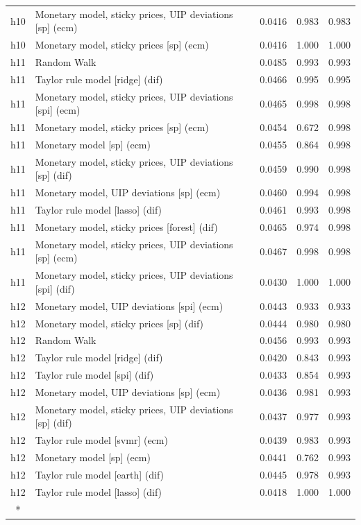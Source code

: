 \begin{ThreePartTable}
\begin{longtable}[t]{cp{5.5cm}ccc}
h10 & \raggedright Monetary model, sticky prices, UIP deviations [sp] (ecm) & 0.0416 & 0.983 & 0.983\\
h10 & \raggedright Monetary model, sticky prices [sp] (ecm) & 0.0416 & 1.000 & 1.000\\
\addlinespace
h11 & \raggedright Random Walk & 0.0485 & 0.993 & 0.993\\
h11 & \raggedright Taylor rule model [ridge] (dif) & 0.0466 & 0.995 & 0.995\\
h11 & \raggedright Monetary model, sticky prices, UIP deviations [spi] (ecm) & 0.0465 & 0.998 & 0.998\\
h11 & \raggedright Monetary model, sticky prices [sp] (ecm) & 0.0454 & 0.672 & 0.998\\
h11 & \raggedright Monetary model [sp] (ecm) & 0.0455 & 0.864 & 0.998\\
h11 & \raggedright Monetary model, sticky prices, UIP deviations [sp] (dif) & 0.0459 & 0.990 & 0.998\\
h11 & \raggedright Monetary model, UIP deviations [sp] (ecm) & 0.0460 & 0.994 & 0.998\\
h11 & \raggedright Taylor rule model [lasso] (dif) & 0.0461 & 0.993 & 0.998\\
h11 & \raggedright Monetary model, sticky prices [forest] (dif) & 0.0465 & 0.974 & 0.998\\
h11 & \raggedright Monetary model, sticky prices, UIP deviations [sp] (ecm) & 0.0467 & 0.998 & 0.998\\
h11 & \raggedright Monetary model, sticky prices, UIP deviations [spi] (dif) & 0.0430 & 1.000 & 1.000\\
\addlinespace
h12 & \raggedright Monetary model, UIP deviations [spi] (ecm) & 0.0443 & 0.933 & 0.933\\
h12 & \raggedright Monetary model, sticky prices [sp] (dif) & 0.0444 & 0.980 & 0.980\\
h12 & \raggedright Random Walk & 0.0456 & 0.993 & 0.993\\
h12 & \raggedright Taylor rule model [ridge] (dif) & 0.0420 & 0.843 & 0.993\\
h12 & \raggedright Taylor rule model [spi] (dif) & 0.0433 & 0.854 & 0.993\\
h12 & \raggedright Monetary model, UIP deviations [sp] (ecm) & 0.0436 & 0.981 & 0.993\\
h12 & \raggedright Monetary model, sticky prices, UIP deviations [sp] (dif) & 0.0437 & 0.977 & 0.993\\
h12 & \raggedright Taylor rule model [svmr] (ecm) & 0.0439 & 0.983 & 0.993\\
h12 & \raggedright Monetary model [sp] (ecm) & 0.0441 & 0.762 & 0.993\\
h12 & \raggedright Taylor rule model [earth] (dif) & 0.0445 & 0.978 & 0.993\\
h12 & \raggedright Taylor rule model [lasso] (dif) & 0.0418 & 1.000 & 1.000\\*
\end{longtable}
\end{ThreePartTable}
\endgroup{}
